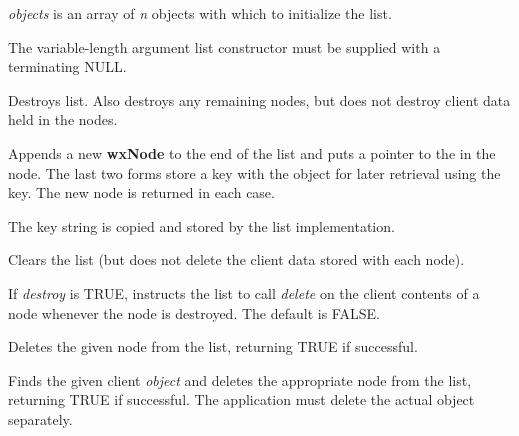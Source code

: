 {\it objects} is an array of {\it n} objects with which to initialize the list.

The variable-length argument list constructor must be supplied with a
terminating NULL.



Destroys list.  Also destroys any remaining nodes, but does not destroy
client data held in the nodes.





Appends a new {\bf wxNode} to the end of the list and puts a pointer to the
 in the node.  The last two forms store a key with the object for
later retrieval using the key. The new node is returned in each case.

The key string is copied and stored by the list implementation.



Clears the list (but does not delete the client data stored with each node).



If {\it destroy} is TRUE, instructs the list to call {\it delete} on the client contents of
a node whenever the node is destroyed. The default is FALSE.



Deletes the given node from the list, returning TRUE if successful.



Finds the given client {\it object} and deletes the appropriate node from the list, returning
TRUE if successful. The application must delete the actual object separately.

